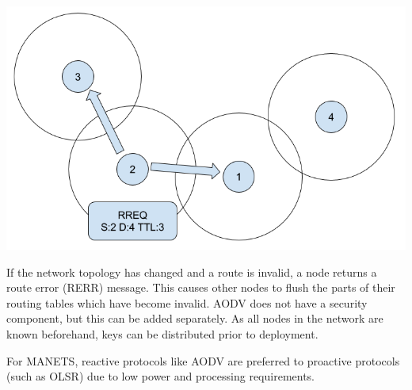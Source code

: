 \documentclass[landscape,a0paper,fontscale=0.285]{baposter} %
\begin{document}
\begin{poster}
{\begin{multicols}{2}
\includegraphics[scale=0.25]{figures/aodv-1}

If the network topology has changed and a route is invalid, a node returns a route error (RERR) message. This causes other nodes to flush the parts of their routing tables which have become invalid. AODV does not have a security component, but this can be added separately. As all nodes in the network are known beforehand, keys can be distributed prior to deployment.
\newline

For MANETS, reactive protocols like AODV are preferred to proactive protocols (such as OLSR) due to low power and processing requirements.
\end{multicols}
}




\end{poster}
\end{document}
